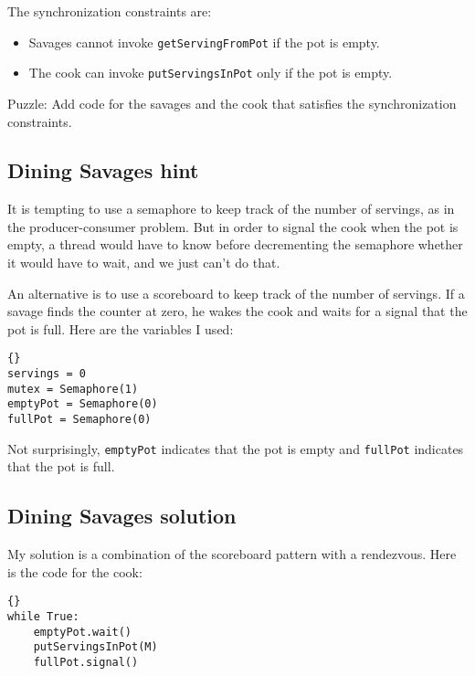\documentclass{book}
\newcommand{\clearemptydoublepage}{\newpage\cleardoublepage}
\begin{document}
The synchronization constraints are:

\begin{itemize}

\item Savages cannot invoke {\tt getServingFromPot} if the
pot is empty.

\item The cook can invoke {\tt putServingsInPot} only if
the pot is empty.

\end{itemize}

Puzzle: Add code for the savages and the cook that
satisfies the synchronization constraints.


\clearemptydoublepage
\subsection{Dining Savages hint}

It is tempting to use a semaphore to keep track of the number of
servings, as in the producer-consumer problem.  But in order to signal
the cook when the pot is empty, a thread would have to know before
decrementing the semaphore whether it would have to wait, and we just
can't do that.

An alternative is to use a scoreboard to
keep track of the number of servings.  If a savage finds
the counter at zero, he wakes the cook and waits for a signal
that the pot is full.  Here are the variables I used:

\begin{lstlisting}[title={Dining Savages hint}]{}
servings = 0
mutex = Semaphore(1)
emptyPot = Semaphore(0)
fullPot = Semaphore(0)
\end{lstlisting}

Not surprisingly, {\tt emptyPot} indicates that the pot is empty and
{\tt fullPot} indicates that the pot is full.

\clearemptydoublepage
\subsection{Dining Savages solution}

My solution is a combination of the scoreboard pattern
with a rendezvous.
Here is the code for the cook:

\begin{lstlisting}[title={Dining Savages solution (cook)}]{}
while True:
    emptyPot.wait()
    putServingsInPot(M)
    fullPot.signal()
\end{lstlisting}
\end{document}
